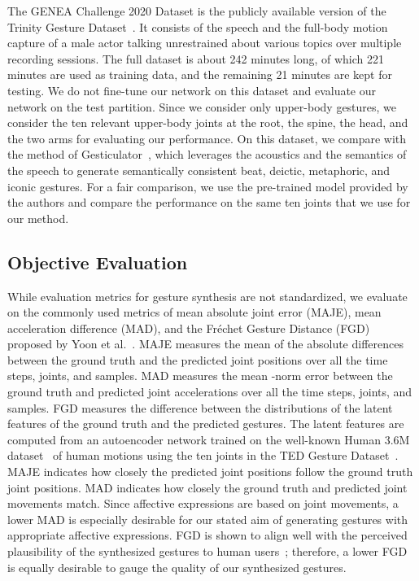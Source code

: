 \documentclass[conference,compsoc]{IEEEtran}
\theoremstyle{definition}
\begin{document}
The GENEA Challenge 2020 Dataset is the publicly available version of the Trinity Gesture Dataset~\cite{genea_2020,genea_2021}. It consists of the speech and the full-body motion capture of a male actor talking unrestrained about various topics over multiple recording sessions. The full dataset is about 242 minutes long, of which 221 minutes are used as training data, and the remaining 21 minutes are kept for testing. We do not fine-tune our network on this dataset and evaluate our network on the test partition. Since we consider only upper-body gestures, we consider the ten relevant upper-body joints at the root, the spine, the head, and the two arms for evaluating our performance. On this dataset, we compare with the method of Gesticulator~\cite{gesticulator}, which leverages the acoustics and the semantics of the speech to generate semantically consistent beat, deictic, metaphoric, and iconic gestures. For a fair comparison, we use the pre-trained model provided by the authors and compare the performance on the same ten joints that we use for our method.

\subsection{Objective Evaluation}
While evaluation metrics for gesture synthesis are not standardized, we evaluate on the commonly used metrics of mean absolute joint error (MAJE), mean acceleration difference (MAD), and the Fr\'echet Gesture Distance (FGD) proposed by Yoon et al.~\cite{trimodal}. MAJE measures the mean of the absolute differences between the ground truth and the predicted joint positions over all the time steps, joints, and samples. MAD measures the mean -norm error between the ground truth and predicted joint accelerations over all the time steps, joints, and samples. FGD measures the difference between the distributions of the latent features of the ground truth and the predicted gestures. The latent features are computed from an autoencoder network trained on the well-known Human 3.6M dataset~\cite{human36m} of human motions using the ten joints in the TED Gesture Dataset~\cite{cospeech_gestures}. MAJE indicates how closely the predicted joint positions follow the ground truth joint positions. MAD indicates how closely the ground truth and predicted joint movements match. Since affective expressions are based on joint movements, a lower MAD is especially desirable for our stated aim of generating gestures with appropriate affective expressions. FGD is shown to align well with the perceived plausibility of the synthesized gestures to human users~\cite{trimodal}; therefore, a lower FGD is equally desirable to gauge the quality of our synthesized gestures.
\end{document}
